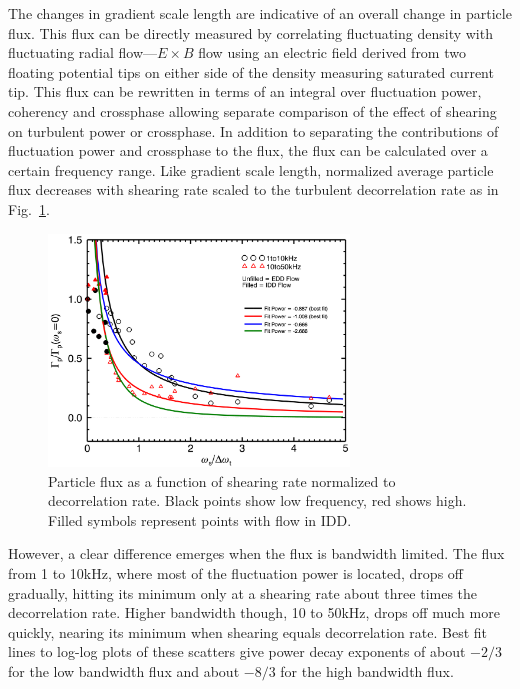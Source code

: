 \documentclass[%
 aip,
 amsmath,amssymb,
 preprint,%
]{revtex4-1}
\begin{document}
The changes in gradient scale length are indicative of an overall change in particle flux. This flux can be directly measured by correlating fluctuating density with fluctuating radial flow---$E \times B$ flow using an electric field derived from two floating potential tips on either side of the density measuring saturated current tip. This flux can be rewritten in terms of an integral over fluctuation power, coherency and crossphase allowing separate comparison of the effect of shearing on turbulent power or crossphase. In addition to separating the contributions of fluctuation power and crossphase to the flux, the flux can be calculated over a certain frequency range. Like gradient scale length, normalized average particle flux decreases with shearing rate scaled to the turbulent decorrelation rate as in 
Fig.~\ref{fig:fluxvsshear}. 
\begin{figure}
\begin{center}
\includegraphics[width=8cm]{fluxvsshear.png}%
\end{center}
\caption{\label{fig:fluxvsshear} Particle flux as a function of shearing rate normalized to decorrelation rate. Black points show low frequency, red shows high. Filled symbols represent points with flow in IDD.}
\end{figure}
However, a clear difference emerges when the flux is bandwidth limited. The flux from 1 to 10kHz, where most of the fluctuation power is located, drops off gradually, hitting its minimum only at a shearing rate about three times the decorrelation rate. Higher bandwidth though, 10 to 50kHz, drops off much more quickly, nearing its minimum when shearing equals decorrelation rate. Best fit lines to log-log plots of these scatters give power decay exponents of about $-2/3$ for the low bandwidth flux and about $-8/3$ for the high bandwidth flux. 
\end{document}
